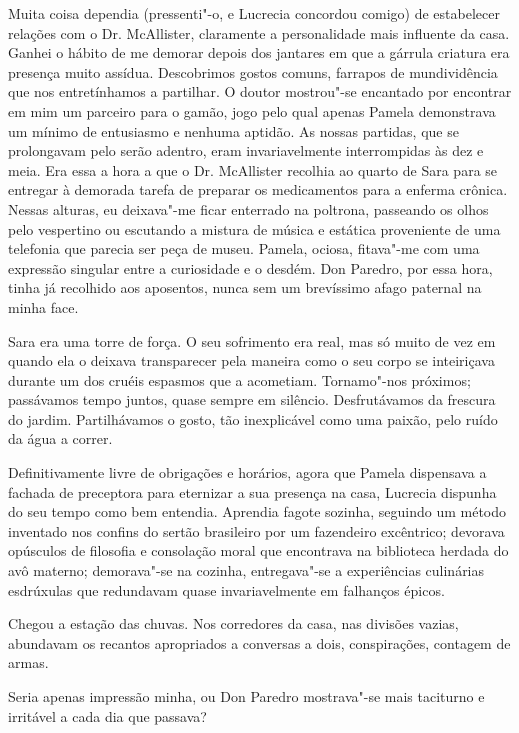Muita coisa dependia (pressenti"-o, e Lucrecia concordou comigo) de
estabelecer relações com o Dr. McAllister, claramente a personalidade mais influente da casa. Ganhei o hábito de me
demorar depois dos jantares em que a gárrula criatura era presença muito
assídua. Descobrimos gostos comuns, farrapos de mundividência que nos
entretínhamos a partilhar. O doutor mostrou"-se encantado por encontrar
em mim um parceiro para o gamão, jogo pelo qual apenas Pamela demonstrava um mínimo de entusiasmo e nenhuma aptidão. As nossas partidas,
que se prolongavam pelo serão adentro, eram invariavelmente
interrompidas às dez e meia. Era essa a hora a que o Dr. McAllister
recolhia ao quarto de Sara para se entregar à demorada tarefa de
preparar os medicamentos para a enferma crônica. Nessas alturas, eu
deixava"-me ficar enterrado na poltrona, passeando os olhos pelo
vespertino ou escutando a mistura de música e estática proveniente de
uma telefonia que parecia ser peça de museu. Pamela, ociosa, fitava"-me
com uma expressão singular entre a curiosidade e o desdém. Don Paredro,
por essa hora, tinha já recolhido aos aposentos, nunca sem um brevíssimo
afago paternal na minha face.

Sara era uma torre de força. O seu sofrimento era real, mas só muito de
vez em quando ela o deixava transparecer pela maneira como o seu corpo
se inteiriçava durante um dos cruéis espasmos que a acometiam.
Tornamo"-nos próximos; passávamos tempo juntos, quase sempre em silêncio.
Desfrutávamos da frescura do jardim. Partilhávamos o gosto, tão inexplicável como uma paixão, pelo ruído da água a correr.

Definitivamente livre de obrigações e horários, agora que Pamela
dispensava a fachada de preceptora para eternizar a sua presença na
casa, Lucrecia dispunha do seu tempo como bem entendia. Aprendia fagote
sozinha, seguindo um método inventado nos confins do sertão brasileiro
por um fazendeiro excêntrico; devorava opúsculos de filosofia e
consolação moral que encontrava na biblioteca herdada do avô materno; demorava"-se
na cozinha, entregava"-se a experiências culinárias esdrúxulas que
redundavam quase invariavelmente em falhanços épicos.

Chegou a estação das chuvas. Nos corredores da casa, nas divisões
vazias, abundavam os recantos apropriados a conversas a dois,
conspirações, contagem de armas.

Seria apenas impressão minha, ou Don Paredro mostrava"-se mais taciturno e irritável a cada dia que passava?

